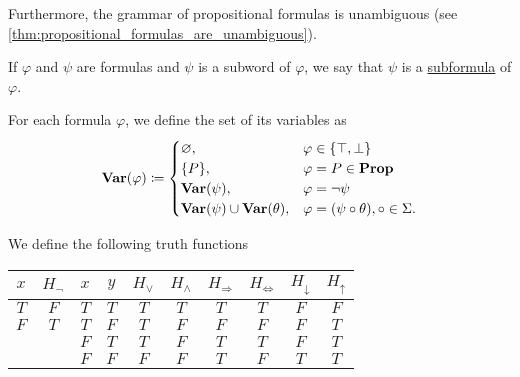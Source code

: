 \begin{definition}
  Furthermore, the grammar of propositional formulas is unambiguous (see \cref{thm:propositional_formulas_are_unambiguous}).

  If $\varphi$ and $\psi$ are formulas and $\psi$ is a subword of $\varphi$, we say that $\psi$ is a \ul{subformula} of $\varphi$.

  For each formula $\varphi$, we define the set of its variables as
  \begin{align*}
    \operatorname{\mathbf{Var}}(\varphi) \coloneqq \begin{cases}
      \varnothing,                              &\varphi \in \{ \top, \bot \} \\
      \{ P \},                                  &\varphi = P \in \operatorname{\mathbf{Prop}} \\
      \operatorname{\mathbf{Var}}(\psi),                         &\varphi = \neg \psi \\
      \operatorname{\mathbf{Var}}(\psi) \cup \operatorname{\mathbf{Var}}(\theta), &\varphi = (\psi \circ \theta), \circ \in \Sigma.
    \end{cases}
  \end{align*}
\end{definition}

\begin{definition}\label{def:truth_functions}
  We define the following truth functions
  \begin{center}
    \begin{tabular}{c | c || c c | c c c c c c}
      $x$    & $H_\neg$ & $x$    & $y$    & $H_\lor$ & $H_\land$ & $H_\Rightarrow$ & $H_{\iff}$ & $H_\downarrow$ & $H_\uparrow$ \\
      \hline
      $T$    & $F$      & $T$    & $T$    & $T$      & $T$       & $T$          & $T$      & $F$            & $F$    \\
      $F$    & $T$      & $T$    & $F$    & $T$      & $F$       & $F$          & $F$      & $F$            & $T$    \\
             &          & $F$    & $T$    & $T$      & $F$       & $T$          & $T$      & $F$            & $T$    \\
             &          & $F$    & $F$    & $F$      & $F$       & $T$          & $F$      & $T$            & $T$
    \end{tabular}
  \end{center}
\end{definition}


